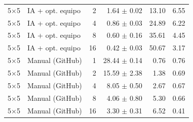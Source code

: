 \begin{tabular}{llrrrr}
5$\times$5 & IA + opt. equipo & 2 & 1.64 $\pm$ 0.02 & 13.10 & 6.55 \\
5$\times$5 & IA + opt. equipo & 4 & 0.86 $\pm$ 0.03 & 24.89 & 6.22 \\
5$\times$5 & IA + opt. equipo & 8 & 0.60 $\pm$ 0.16 & 35.61 & 4.45 \\
5$\times$5 & IA + opt. equipo & 16 & 0.42 $\pm$ 0.03 & 50.67 & 3.17 \\
5$\times$5 & Manual (GitHub) & 1 & 28.44 $\pm$ 0.14 & 0.76 & 0.76 \\
5$\times$5 & Manual (GitHub) & 2 & 15.59 $\pm$ 2.38 & 1.38 & 0.69 \\
5$\times$5 & Manual (GitHub) & 4 & 8.05 $\pm$ 0.50 & 2.67 & 0.67 \\
5$\times$5 & Manual (GitHub) & 8 & 4.06 $\pm$ 0.80 & 5.30 & 0.66 \\
5$\times$5 & Manual (GitHub) & 16 & 3.30 $\pm$ 0.31 & 6.52 & 0.41 \\
\bottomrule
\end{tabular}
